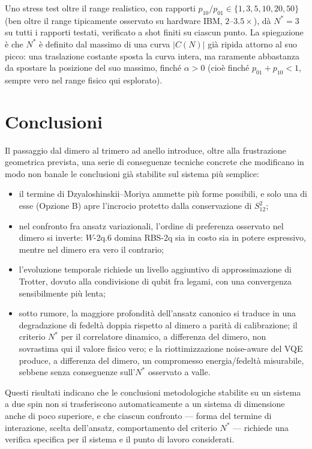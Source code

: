 \documentclass[11pt,a4paper]{article}
\begin{document}
Uno stress test oltre il range realistico, con rapporti
$p_{10}/p_{01}\in\{1,3,5,10,20,50\}$ (ben oltre il range tipicamente
osservato su hardware IBM, $2$--$3.5\times$), dà $N^*=3$ su tutti i
rapporti testati, verificato a shot finiti su ciascun punto. La
spiegazione è che $N^*$ è definito dal massimo di una curva $|C(N)|$ già
ripida attorno al suo picco: una traslazione costante sposta la curva
intera, ma raramente abbastanza da spostare la posizione del suo
massimo, finché $\alpha>0$ (cioè finché $p_{01}+p_{10}<1$, sempre vero
nel range fisico qui esplorato).

\section{Conclusioni}

Il passaggio dal dimero al trimero ad anello introduce, oltre alla
frustrazione geometrica prevista, una serie di conseguenze tecniche
concrete che modificano in modo non banale le conclusioni già stabilite
sul sistema più semplice:

\begin{itemize}[leftmargin=1.6em,itemsep=3pt]
\item il termine di Dzyaloshinskii--Moriya ammette più forme possibili,
e solo una di esse (Opzione B) apre l'incrocio protetto dalla
conservazione di $S_{12}^2$;
\item nel confronto fra ansatz variazionali, l'ordine di preferenza
osservato nel dimero si inverte: $W$-2q.6 domina RBS-2q sia in costo sia
in potere espressivo, mentre nel dimero era vero il contrario;
\item l'evoluzione temporale richiede un livello aggiuntivo di
approssimazione di Trotter, dovuto alla condivisione di qubit fra legami,
con una convergenza sensibilmente più lenta;
\item sotto rumore, la maggiore profondità dell'ansatz canonico si
traduce in una degradazione di fedeltà doppia rispetto al dimero a parità
di calibrazione; il criterio $N^*$ per il correlatore dinamico, a
differenza del dimero, non sovrastima qui il valore fisico vero; e la
riottimizzazione noise-aware del VQE produce, a differenza del dimero, un
compromesso energia/fedeltà misurabile, sebbene senza conseguenze
sull'$N^*$ osservato a valle.
\end{itemize}

Questi risultati indicano che le conclusioni metodologiche stabilite su
un sistema a due spin non si trasferiscono automaticamente a un sistema
di dimensione anche di poco superiore, e che ciascun confronto --- forma
del termine di interazione, scelta dell'ansatz, comportamento del
criterio $N^*$ --- richiede una verifica specifica per il sistema e il
punto di lavoro considerati.
\end{document}
